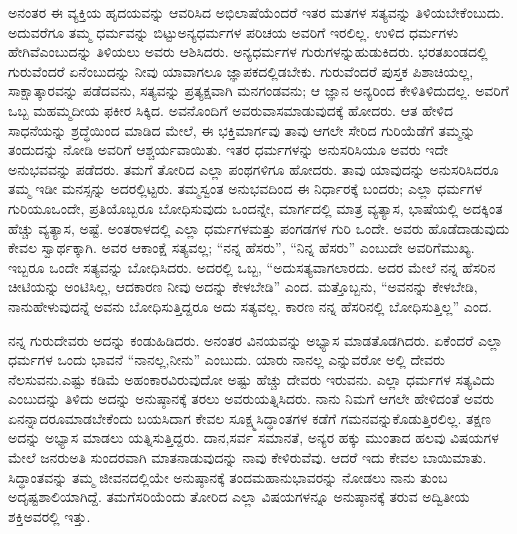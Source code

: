 ಅನಂತರ ಈ ವ್ಯಕ್ತಿಯ ಹೃದಯವನ್ನು ಆವರಿಸಿದ ಅಭಿಲಾಷೆಯೆಂದರೆ ಇತರ ಮತಗಳ ಸತ್ಯವನ್ನು ತಿಳಿಯಬೇಕೆಂಬುದು. ಅದುವರೆಗೂ ತಮ್ಮ ಧರ್ಮವನ್ನು ಬಿಟ್ಟು\break ಅನ್ಯಧರ್ಮಗಳ ಪರಿಚಯ ಅವರಿಗೆ ಇರಲಿಲ್ಲ. ಉಳಿದ ಧರ್ಮಗಳು ಹೇಗಿವೆ\break ಎಂಬುದನ್ನು ತಿಳಿಯಲು ಅವರು ಆಶಿಸಿದರು. ಅನ್ಯಧರ್ಮಗಳ ಗುರುಗಳನ್ನು\break ಹುಡುಕಿದರು. ಭರತಖಂಡದಲ್ಲಿ ಗುರುವೆಂದರೆ ಏನೆಂಬುದನ್ನು ನೀವು ಯಾವಾಗಲೂ ಜ್ಞಾಪಕದಲ್ಲಿಡಬೇಕು. ಗುರುವೆಂದರೆ ಪುಸ್ತಕ ಪಿಶಾಚಿಯಲ್ಲ, ಸಾಕ್ಷಾತ್ಕಾರವನ್ನು ಪಡೆ\break ದವನು, ಸತ್ಯವನ್ನು ಪ್ರತ್ಯಕ್ಷವಾಗಿ ಮನಗಂಡವನು; ಆ ಜ್ಞಾನ ಅನ್ಯರಿಂದ ಕೇಳಿ\break ತಿಳಿದುದಲ್ಲ. ಅವರಿಗೆ ಒಬ್ಬ ಮಹಮ್ಮದೀಯ ಫಕೀರ ಸಿಕ್ಕಿದ. ಅವನೊಂದಿಗೆ ಅವರು\break ವಾಸಮಾಡುವುದಕ್ಕೆ ಹೋದರು. ಆತ ಹೇಳಿದ ಸಾಧನೆಯನ್ನು ಶ್ರದ್ಧೆಯಿಂದ ಮಾಡಿದ ಮೇಲೆ, ಈ ಭಕ್ತಿಮಾರ್ಗವು ತಾವು ಆಗಲೇ ಸೇರಿದ ಗುರಿಯೆಡೆಗೆ ತಮ್ಮನ್ನು ತಂದುದನ್ನು ನೋಡಿ ಅವರಿಗೆ ಆಶ್ಚರ್ಯವಾಯಿತು. ಇತರ ಧರ್ಮಗಳನ್ನು ಅನುಸರಿಸಿಯೂ ಅವರು ಇದೇ ಅನುಭವವನ್ನು ಪಡೆದರು. ತಮಗೆ ತೋರಿದ ಎಲ್ಲಾ ಪಂಥಗಳಿಗೂ ಹೋದರು. ತಾವು ಯಾವುದನ್ನು ಅನುಸರಿಸಿದರೂ ತಮ್ಮ ಇಡೀ ಮನಸ್ಸನ್ನು ಅದರಲ್ಲಿಟ್ಟರು. ತಮ್ಮ\break ಸ್ವಂತ ಅನುಭವದಿಂದ ಈ ನಿರ್ಧಾರಕ್ಕೆ ಬಂದರು; ಎಲ್ಲಾ ಧರ್ಮಗಳ ಗುರಿಯೂ\break ಒಂದೇ, ಪ್ರತಿಯೊಬ್ಬರೂ ಬೋಧಿಸುವುದು ಒಂದನ್ನೇ, ಮಾರ್ಗದಲ್ಲಿ ಮಾತ್ರ ವ್ಯತ್ಯಾಸ, ಭಾಷೆಯಲ್ಲಿ ಅದಕ್ಕಿಂತ ಹೆಚ್ಚು ವ್ಯತ್ಯಾಸ, ಅಷ್ಟೆ. ಅಂತರಾಳದಲ್ಲಿ ಎಲ್ಲಾ ಧರ್ಮಗಳ\break ಮತ್ತು ಪಂಗಡಗಳ ಗುರಿ ಒಂದೇ. ಅವರು ಹೊಡೆದಾಡುವುದು ಕೇವಲ ಸ್ವಾರ್ಥಕ್ಕಾಗಿ. ಅವರ ಆಕಾಂಕ್ಷೆ ಸತ್ಯವಲ್ಲ; “ನನ್ನ ಹೆಸರು”, “ನಿನ್ನ ಹೆಸರು” ಎಂಬುದೇ ಅವರಿಗೆ\break ಮುಖ್ಯ. ಇಬ್ಬರೂ ಒಂದೇ ಸತ್ಯವನ್ನು ಬೋಧಿಸಿದರು. ಅದರಲ್ಲಿ ಒಬ್ಬ, “ಅದು\break ಸತ್ಯವಾಗಲಾರದು. ಅದರ ಮೇಲೆ ನನ್ನ ಹೆಸರಿನ ಚೀಟಿಯನ್ನು ಅಂಟಿಸಿಲ್ಲ, ಆದಕಾರಣ ನೀವು ಅದನ್ನು ಕೇಳಬೇಡಿ” ಎಂದ. ಮತ್ತೊಬ್ಬನು, “ಅವನನ್ನು ಕೇಳಬೇಡಿ, ನಾನು\break ಹೇಳುವುದನ್ನೆ ಅವನು ಬೋಧಿಸುತ್ತಿದ್ದರೂ ಅದು ಸತ್ಯವಲ್ಲ. ಕಾರಣ ನನ್ನ ಹೆಸರಿನಲ್ಲಿ ಬೋಧಿಸುತ್ತಿಲ್ಲ” ಎಂದ.

ನನ್ನ ಗುರುದೇವರು ಅದನ್ನು ಕಂಡುಹಿಡಿದರು. ಅನಂತರ ವಿನಯವನ್ನು ಅಭ್ಯಾಸ ಮಾಡತೊಡಗಿದರು. ಏಕೆಂದರೆ ಎಲ್ಲಾ ಧರ್ಮಗಳ ಒಂದು ಭಾವನೆ “ನಾನಲ್ಲ,\break ನೀನು” ಎಂಬುದು. ಯಾರು ನಾನಲ್ಲ ಎನ್ನುವರೋ ಅಲ್ಲಿ ದೇವರು ನೆಲಸುವನು.\break ಎಷ್ಟು ಕಡಿಮೆ ಅಹಂಕಾರವಿರುವುದೋ ಅಷ್ಟು ಹೆಚ್ಚು ದೇವರು ಇರುವನು. ಎಲ್ಲಾ ಧರ್ಮಗಳ ಸತ್ಯವಿದು ಎಂಬುದನ್ನು ತಿಳಿದು ಅದನ್ನು ಅನುಷ್ಠಾನಕ್ಕೆ ತರಲು ಅವರು\break ಯತ್ನಿಸಿದರು. ನಾನು ನಿಮಗೆ ಆಗಲೇ ಹೇಳಿದಂತೆ ಅವರು ಏನನ್ನಾದರೂ\break ಮಾಡಬೇಕೆಂದು ಬಯಸಿದಾಗ ಕೇವಲ ಸೂಕ್ಷ್ಮಸಿದ್ಧಾಂತಗಳ ಕಡೆಗೆ ಗಮನವನ್ನು\break ಕೊಡುತ್ತಿರಲಿಲ್ಲ. ತಕ್ಷಣ ಅದನ್ನು ಅಭ್ಯಾಸ ಮಾಡಲು ಯತ್ನಿಸುತ್ತಿದ್ದರು. ದಾನ,\break ಸರ್ವ ಸಮಾನತೆ, ಅನ್ಯರ ಹಕ್ಕು ಮುಂತಾದ ಹಲವು ವಿಷಯಗಳ ಮೇಲೆ ಜನರು\break ಅತಿ ಸುಂದರವಾಗಿ ಮಾತನಾಡುವುದನ್ನು ನಾವು ಕೇಳಿರುವೆವು. ಆದರೆ ಇದು ಕೇವಲ ಬಾಯಿಮಾತು. ಸಿದ್ಧಾಂತವನ್ನು ತಮ್ಮ ಜೀವನದಲ್ಲಿಯೇ ಅನುಷ್ಠಾನಕ್ಕೆ ತಂದ\break ಮಹಾನುಭಾವರನ್ನು ನೋಡಲು ನಾನು ತುಂಬ ಅದೃಷ್ಟಶಾಲಿಯಾಗಿದ್ದೆ. ತಮಗೆ\break ಸರಿಯೆಂದು ತೋರಿದ ಎಲ್ಲಾ ವಿಷಯಗಳನ್ನೂ ಅನುಷ್ಠಾನಕ್ಕೆ ತರುವ ಅದ್ವಿತೀಯ ಶಕ್ತಿ\break ಅವರಲ್ಲಿ ಇತ್ತು.

